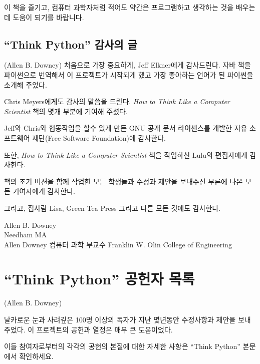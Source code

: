 이 책을 즐기고, 컴퓨터 과학자처럼 적어도 약간은 프로그램하고 생각하는 것을 배우는데 도움이 되기를 바랍니다.

\subsection*{``Think Python'' 감사의 글}

(Allen B. Downey)
처음으로 가장 중요하게, Jeff Elkner에게 감사드린다. 자바 책을 파이썬으로 번역해서
이 프로젝트가 시작되게 했고 가장 좋아하는 언어가 된 파이썬을 소개해 주었다.

Chris Meyers에게도 감사의 말씀을 드린다. \emph{How to Think Like a Computer Scientist} 책의 몇개 부분에 기여해 주셨다.

Jeff와 Chris와 협동작업을 할수 있게 만든 GNU 공개 문서 라이센스를 개발한 
자유 소프트웨어 재단(Free Software Foundation)에 감사한다.


또한, \emph{How to Think Like a Computer Scientist} 책을 작업하신 Lulu의 편집자에게 감사한다.

책의 초기 버젼을 함께 작업한 모든 학생들과 수정과 제안을 보내주신 부론에 나온 모든 기여자에게 감사한다.

그리고, 집사람 Lisa, Green Tea Press 그리고 다른 모든 것에도 감사한다.

Allen B. Downey \\
Needham MA\\

Allen Downey 
컴퓨터 과학 부교수
Franklin W. Olin College of Engineering

\section*{``Think Python'' 공헌자 목록}


(Allen B. Downey)

날카로운 눈과 사려깊은 100명 이상의 독자가 지난 몇년동안 수정사항과 제안을 보내주었다.
이 프로젝트의 공헌과 열정은 매우 큰 도움이었다.

이들 참여자로부터의 각각의 공헌의 본질에 대한 자세한 사항은 ``Think Python'' 본문에서 확인하세요.

